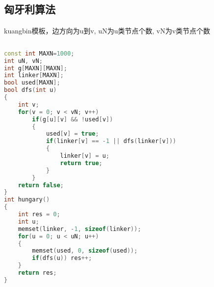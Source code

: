 ﻿\subsection{匈牙利算法}
	\paragraph{}
	kuangbin模板，边方向为u到v, uN为u类节点个数, vN为v类节点个数
	\begin{lstlisting}[language=C++]
	
const int MAXN=1000;
int uN, vN;
int g[MAXN][MAXN]; 
int linker[MAXN];
bool used[MAXN];
bool dfs(int u)
{
    int v;
    for(v = 0; v < vN; v++)
        if(g[u][v] && !used[v])
        {
            used[v] = true;
            if(linker[v] == -1 || dfs(linker[v]))
            {
                linker[v] = u;
                return true;
            }    
        }  
    return false;  
}    
int hungary()
{
    int res = 0;
    int u;
    memset(linker, -1, sizeof(linker));
    for(u = 0; u < uN; u++)
    {
        memset(used, 0, sizeof(used));
        if(dfs(u)) res++;
    }
    return res;   
}	
	\end{lstlisting}
	
